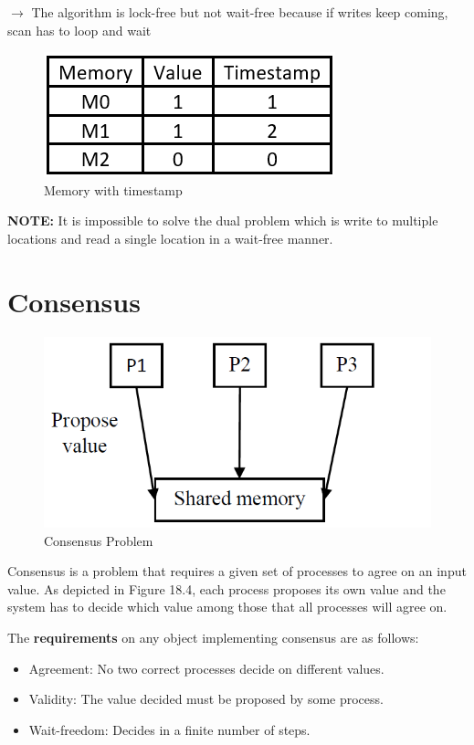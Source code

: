 \documentclass[twoside]{article}
\begin{document}
$\rightarrow$ The algorithm is lock-free but not wait-free because if writes keep coming, scan has to loop and wait

\begin{figure}[H]
    \centering
    \includegraphics{timestamp.png}
    \caption{Memory with timestamp}
    \label{fig:3}
\end{figure}

\textbf{NOTE: } It is impossible to solve the dual problem which is write to multiple locations and read a single location in a wait-free manner.



\section{Consensus}

\begin{figure}[H]
    \centering
    \includegraphics[scale=0.75]{sharedmemory.png}
    \caption{Consensus Problem}
    \label{fig:4}
\end{figure}

Consensus is a problem that requires a given set of processes to agree on an input value. As depicted in Figure 18.4, each process proposes its own value and the system has to decide which value among those that all processes will agree on.

The \textbf{requirements} on any object implementing consensus are as follows:
\begin{itemize}
    \item Agreement:  No two correct processes decide on different values.
    \item Validity: The value decided must be proposed by some process.
    \item Wait-freedom: Decides in a finite number of steps.
\end{itemize}
\end{document}
